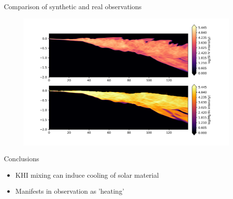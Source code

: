 \documentclass[10pt,aspectratio=169,usenames,dvipsnames]{beamer}
\begin{document}
\begin{frame}{Comparison of synthetic and real observations}
\begin{figure}
\includegraphics[width=0.95\linewidth]{2023Dundee/Figures/KHIrl2D_dt_thinintens.png}
\end{figure}
\end{frame}

\begin{frame}{Conclusions}
\begin{itemize}
    \item KHI mixing can induce cooling of solar material
    \item Manifests in observation as 'heating'
\end{itemize}
\end{frame}
\end{document}
